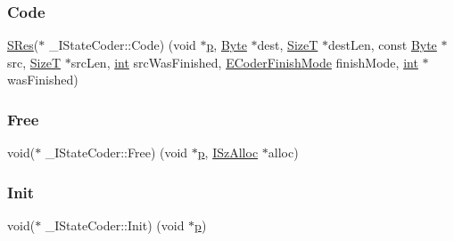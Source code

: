 \subsubsection{\texorpdfstring{Code}{Code}}
{\footnotesize\ttfamily \mbox{\hyperlink{7z_types_8h_acc0053eeb62726b68b22e8c7d9e91367}{S\+Res}}($\ast$ \+\_\+\+I\+State\+Coder\+::\+Code) (void $\ast$\mbox{\hyperlink{struct___i_state_coder_a7956e4f358a8e8a3e0e03f19691d2305}{p}}, \mbox{\hyperlink{7z_types_8h_ae3a497195d617519e5353ea7b417940f}{Byte}} $\ast$dest, \mbox{\hyperlink{7z_types_8h_a4f8e2163e01de507a0ac376e8ec2b796}{SizeT}} $\ast$dest\+Len, const \mbox{\hyperlink{7z_types_8h_ae3a497195d617519e5353ea7b417940f}{Byte}} $\ast$src, \mbox{\hyperlink{7z_types_8h_a4f8e2163e01de507a0ac376e8ec2b796}{SizeT}} $\ast$src\+Len, \mbox{\hyperlink{ioapi_8h_a787fa3cf048117ba7123753c1e74fcd6}{int}} src\+Was\+Finished, \mbox{\hyperlink{_xz_8h_ac449eaa46953542d10dbe2919e817e8e}{E\+Coder\+Finish\+Mode}} finish\+Mode, \mbox{\hyperlink{ioapi_8h_a787fa3cf048117ba7123753c1e74fcd6}{int}} $\ast$was\+Finished)}

\mbox{\label{struct___i_state_coder_ac1786b2607edbd446a7f2ac97f39edd1}} 
\subsubsection{\texorpdfstring{Free}{Free}}
{\footnotesize\ttfamily void($\ast$ \+\_\+\+I\+State\+Coder\+::\+Free) (void $\ast$\mbox{\hyperlink{struct___i_state_coder_a7956e4f358a8e8a3e0e03f19691d2305}{p}}, \mbox{\hyperlink{struct_i_sz_alloc}{I\+Sz\+Alloc}} $\ast$alloc)}

\mbox{\label{struct___i_state_coder_a6a9719579a2d5c237c2d135b23ccb458}} 
\subsubsection{\texorpdfstring{Init}{Init}}
{\footnotesize\ttfamily void($\ast$ \+\_\+\+I\+State\+Coder\+::\+Init) (void $\ast$\mbox{\hyperlink{struct___i_state_coder_a7956e4f358a8e8a3e0e03f19691d2305}{p}})}

\mbox{\label{struct___i_state_coder_a7956e4f358a8e8a3e0e03f19691d2305}} 
